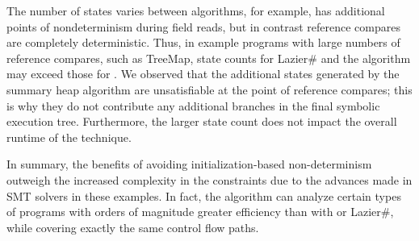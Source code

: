 The number of states varies between algorithms, for example, \gsetxt{}
has additional points of nondeterminism during field reads, but in
contrast reference compares are completely deterministic. Thus, in
example programs with large numbers of reference compares, such as
TreeMap, state counts for Lazier\# and the \symtxt{} algorithm may
exceed those for \gsetxt{}. We observed that the additional states
generated by the summary heap algorithm are unsatisfiable at the point
of reference compares; this is why they do not contribute any
additional branches in the final symbolic execution tree. Furthermore,
the larger state count does not impact the overall runtime of the
technique.




In summary, the benefits of avoiding
initialization-based non-determinism outweigh the increased
complexity in the constraints due to the advances made in SMT
solvers in these examples. In fact, the \symtxt{} algorithm can analyze certain types of programs with
orders of magnitude greater efficiency than with \gsetxt{} or
Lazier\#, while covering exactly the same control flow paths. 
